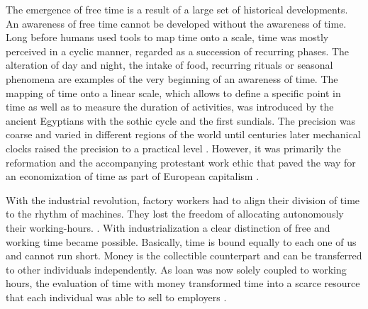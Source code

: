 \documentclass[12pt,numbers=noenddot,parskip,bibliography=totocnumbered,listof=totocnumbered]{scrreprt}
\begin{document}
The emergence of free time is a result of a large set of historical developments. An awareness of free time cannot be developed without the awareness of time. Long before humans used tools to map time onto a scale, time was mostly perceived in a cyclic manner, regarded as a succession of recurring phases. The alteration of day and night, the intake of food, recurring rituals or seasonal phenomena are examples of the very beginning of an awareness of time. The mapping of time onto a linear scale, which allows to define a specific point in time as well as to measure the duration of activities, was introduced by the ancient Egyptians with the sothic cycle and the first sundials. \citep[p.25-27]{whitrow1989} The precision was coarse and varied in different regions of the world until centuries later mechanical clocks raised the precision to a practical level \citep[p.103]{whitrow1989}. However, it was primarily the reformation and the accompanying protestant work ethic that paved the way for an economization of time as part of European capitalism \citep[p.22]{weber2006}.

With the industrial revolution, factory workers had to align their division of time to the rhythm of machines. They lost the freedom of allocating autonomously their working-hours. \citep[p.160]{whitrow1989}. With industrialization a clear distinction of free and working time became possible. Basically, time is bound equally to each one of us and cannot run short. Money is the collectible counterpart and can be transferred to other individuals independently. As loan was now solely coupled to working hours, the evaluation of time with money transformed time into a scarce resource that each individual was able to sell to employers \citep[p.54]{marx1867}. 
\end{document}
